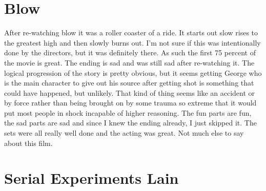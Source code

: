 \documentclass[12pt]{extarticle}
\theoremstyle{plain}
\theoremstyle{plain}
\theoremstyle{plain}
\theoremstyle{Definition}
\theoremstyle{Definition}
\theoremstyle{plain}
\theoremstyle{plain}
\begin{document}
	\section{Blow}
	After re-watching blow it was a roller coaster of a ride. It starts out slow rises to the greatest high and then slowly burns out. I'm not sure if this was intentionally done by the directors, but it was definitely there. As such the first 75 percent of the movie is great. The ending is sad and was still sad after re-watching it. The logical progression of the story is pretty obvious, but it seems getting George who is the main character to give out his source after getting shot is something that could have happened, but unlikely. That kind of thing seems like an accident or by force rather than being brought on by some trauma so extreme that it would put most people in shock incapable of higher reasoning. The fun parts are fun, the sad parts are sad and since I knew the ending already, I just skipped it. The sets were all really well done and the acting was great. Not much else to say about this film. 
	
	\section{Serial Experiments Lain}
\end{document}
